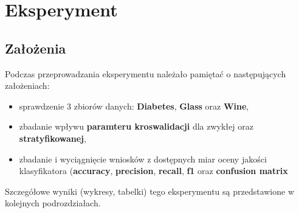 \pagebreak
\section{Eksperyment}
    \subsection{Założenia}
    Podczas przeprowadzania eksperymentu należało pamiętać o następujących założeniach:
    \begin{itemize}
        \item{sprawdzenie 3 zbiorów danych: \textbf{Diabetes}, \textbf{Glass} oraz \textbf{Wine},}
        \item{zbadanie wpływu \textbf{paramteru kroswalidacji} dla zwykłej oraz \textbf{stratyfikowanej},}
        \item{zbadanie i wyciągnięcie wniosków z dostępnych miar oceny jakości klasyfikatora
              (\textbf{accuracy}, \textbf{precision}, \textbf{recall}, \textbf{f1} oraz \textbf{confusion matrix}}
    \end{itemize}
    Szczegółowe wyniki (wykresy, tabelki) tego eksperymentu są przedstawione w kolejnych podrozdziałach.

    
